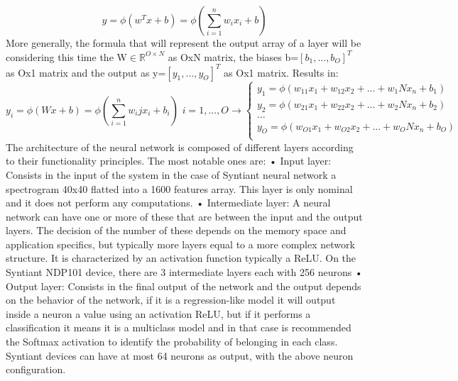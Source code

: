 \begin{equation}
    y=\phi(w^Tx+b)=\phi(\sum_{i=1}^{n}w_ix_i+b)
\end{equation}
More generally, the formula that will represent the output array of a layer will be considering this time the W$\in\mathbb{R}^{O\times N}$ as OxN matrix, the biases b=$[b_1,...,b_O]^T$ as Ox1 matrix and the output as y=$[y_1,...,y_O]^T$ as Ox1 matrix. Results in:
\begin{equation}
    y_i=\phi(Wx+b)=\phi(\sum_{i=1}^{n}w_ijx_i+b_i)\,\,i=1,...,O\rightarrow \begin{cases}
        y_1=\phi(w_{11}x_1+w_{12}x_2+...+w_1Nx_n+b_1)\\
        y_2=\phi(w_{21}x_1+w_{22}x_2+...+w_2Nx_n+b_2)\\
        \dots\\
        y_O=\phi(w_{O1}x_1+w_{O2}x_2+...+w_ONx_n+b_O)\\
    \end{cases}
\end{equation}
The architecture of the neural network is composed of different layers according to their functionality principles. The most notable ones are:\newline
• Input layer: Consists in the input of the system in the case of Syntiant neural network a spectrogram 40x40 flatted into a 1600 features array. This layer is only nominal and it does not perform any computations.\newline 
• Intermediate layer: A neural network can have one or more of these that are between the input and the output layers. The decision of the number of these depends on the memory space and application specifics, but typically more layers equal to a more complex network structure. It is characterized by an activation function typically a ReLU. On the Syntiant NDP101 device, there are 3 intermediate layers each with 256 neurons\newline
• Output layer: Consists in the final output of the network and the output depends on the behavior of the network, if it is a regression-like model it will output inside a neuron a value using an activation ReLU, but if it performs a classification it means it is a multiclass model and in that case is recommended the Softmax activation to identify the probability of belonging in each class. Syntiant devices can have at most 64 neurons as output, with the above neuron configuration.\newline
